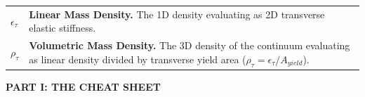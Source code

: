 \documentclass[11pt, a4paper]{article}
\begin{document}
\begin{tcolorbox}[colback=white, colframe=academiabrown!90!black, arc=1mm, boxrule=0.8pt, title={\textbf{TABLE 1: KINEMATIC NOMENCLATURE \& METRIC CONSTANTS}}]
\begin{tabular}{p{} p{}}
    $\epsilon_{\tau}$ & \textbf{Linear Mass Density.} The 1D density evaluating as 2D transverse elastic stiffness. \\
    $\rho_{\tau}$ & \textbf{Volumetric Mass Density.} The 3D density of the continuum evaluating as linear density divided by transverse yield area ($\rho_{\tau} = \epsilon_{\tau} / A_{yield}$). \\
\end{tabular}
\end{tcolorbox}
\newpage
\begin{center}
    \LARGE\textbf{PART I: THE CHEAT SHEET}
\end{center}
\vspace{0.2cm}
\end{document}
